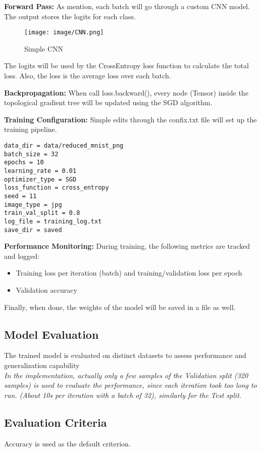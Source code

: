 \documentclass[conference]{IEEEtran}
\begin{document}
\textbf{Forward Pass:} As mention, each batch will go through a custom CNN model. The output stores the logits for each class.

\begin{figure}[htbp]
\centerline{\texttt{[image: image/CNN.png]}}
\caption{Simple CNN}
\label{fig:CNN}
\end{figure}

The logits will be used by the CrossEntropy loss function to calculate the total loss. Also, the loss is the average loss over each batch.

\textbf{Backpropagation:} When call loss.backward(), every node (Tensor) inside the topological gradient tree will be updated using the SGD algorithm.

\textbf{Training Configuration:} Simple edits through the confix.txt file will set up the training pipeline.
\begin{verbatim}
data_dir = data/reduced_mnist_png
batch_size = 32
epochs = 10
learning_rate = 0.01
optimizer_type = SGD
loss_function = cross_entropy
seed = 11
image_type = jpg
train_val_split = 0.8
log_file = training_log.txt
save_dir = saved
\end{verbatim}

\textbf{Performance Monitoring:} During training, the following metrics are tracked and logged:
\begin{itemize}
\item Training loss per iteration (batch) and training/validation loss per epoch
\item Validation accuracy
\end{itemize}

Finally, when done, the weights of the model will be saved in a file as well.

\subsection{Model Evaluation}
The trained model is evaluated on distinct datasets to assess performance and generalization capability\\

\noindent \textit{In the implementation, actually only a few samples of the Validation split (320 samples) is used to evaluate the performance, since each iteration took too long to run. (About 10s per iteration with a batch of 32), similarly for the Test split.}

\subsection{Evaluation Criteria}
Accuracy is used as the default criterion.
\end{document}
